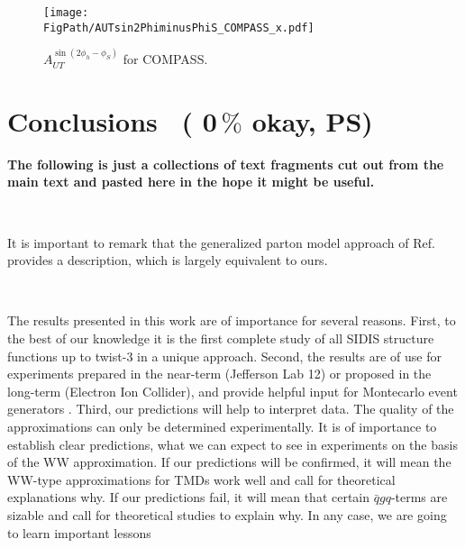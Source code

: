 \documentclass[a4paper,11pt]{article}
\newcommand{\blue}[1]{{\color{blue} #1}}
\newcommand{\red}[1]{{\color{red} #1}}
\newcommand{\judge}[1]{{\boldmath \ ({\lowercase\blue{#1}}, PS)}}
\newcommand*{\FigPath}{./figs}%
\begin{document}
\begin{figure}[ht]
\centering
\texttt{[image: \\FigPath/AUTsin2PhiminusPhiS\_COMPASS\_x.pdf]} 
\caption{\label{autsin2phi_jlab} $A_{UT}^{\sin(2\phi_h- \phi_S)}$  for COMPASS.
}
\end{figure}






{}

\newpage
\section{Conclusions  \judge{0$\,\%$ okay}}
\label{Sec-8:conclusions}

\red{\bf The following is just a collections of text fragments cut out
from the main text and pasted here in the hope it might be useful.}

\

It is important to remark that the generalized parton model 
approach of Ref.~\cite{Anselmino:2011ch} provides a description,
which is largely equivalent to ours.

\

The results presented in this work are of importance for several reasons.
First, to the best of our knowledge it is the first complete study 
of all SIDIS structure functions up to twist-3 in a unique approach. 
Second, the results are of use for experiments prepared in the near-term 
(Jefferson Lab 12) or proposed in the long-term (Electron Ion Collider),
and provide helpful input for Montecarlo event generators 
\cite{Avakian:2015vha}.
Third, our predictions will help to interpret data.
The quality of the approximations can only be determined experimentally. 
It is of importance to establish clear predictions, what we can expect 
to see in experiments on the basis of the WW approximation.
If our predictions will be confirmed, it will mean the WW-type approximations
for TMDs work well and call for theoretical explanations why.
If our predictions fail, it will mean that certain $\bar{q}gq$-terms are
sizable and call for theoretical studies to explain why.
In any case, we are going to learn important lessons
\end{document}
